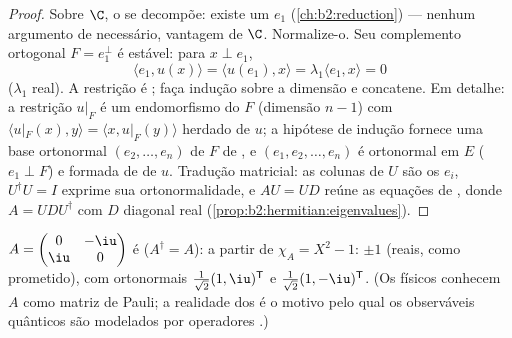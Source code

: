 \begin{proof}
Sobre $\C$, o  se decompõe: existe um 
$e_1$ (\cref{ch:b2:reduction}) --- nenhum argumento de 
necessário, vantagem de $\C$. Normalize-o. Seu complemento
ortogonal $F = e_1^\perp$ é estável: para $x \perp e_1$,
\[
\langle e_1, u(x)\rangle = \langle u(e_1), x\rangle
= \lambda_1\langle e_1, x\rangle = 0
\]
($\lambda_1$ real). A restrição é ; faça indução sobre a
dimensão e concatene. Em detalhe: a restrição $u|_F$ é
um endomorfismo do  $F$ (dimensão $n - 1$)
com $\langle u|_F(x), y\rangle = \langle x, u|_F(y)\rangle$
herdado de $u$; a hipótese de indução fornece uma
base ortonormal $(e_2, \dots, e_n)$ de $F$ de ,
e $(e_1, e_2, \dots, e_n)$ é ortonormal em $E$ ($e_1 \perp
F$) e formada de  de $u$. Tradução matricial: as
colunas de $U$ são os $e_i$, $U^\dagger U = I$ exprime sua
ortonormalidade, e $AU = UD$ reúne as equações de
, donde $A = UDU^\dagger$ com $D$ diagonal real
(\cref{prop:b2:hermitian:eigenvalues}).
\end{proof}

\begin{example}\label{ex:b2:hermitian:pauli}
$A = \begin{pmatrix} 0 & -\iu\\ \iu & 0\end{pmatrix}$ é 
($A^\dagger = A$):  a partir de $\chi_A = X^2 - 1$: $\pm 1$
(reais, como prometido), com  ortonormais
$\frac{1}{\sqrt2}(1, \iu)^{\mathsf T}$ e $\frac{1}{\sqrt2}(1,
-\iu)^{\mathsf T}$. (Os físicos conhecem $A$ como matriz de Pauli; a
realidade dos   é o motivo pelo qual os observáveis quânticos são modelados
por operadores .)
\end{example}

